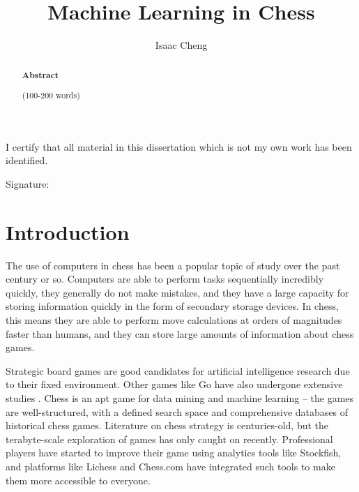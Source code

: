 \documentclass[%
 superscriptaddress,
showpacs,preprintnumbers,
 amsmath,
 amssymb,
 aps,
 pra,
showkeys,
onecolumn,
notitlepage,
11pt,
tightenlines      %
]{revtex4-1}
\begin{document}
\title{\Large Machine Learning in Chess}

\author{Isaac Cheng}

\begin{abstract}
\noindent \textbf{Abstract}

\noindent 
(100-200 words)

\end{abstract}

\maketitle

\vspace*{\fill}


\begin{center}
I certify that all material in this dissertation which is not my own work has been identified.
\end{center}
\vspace{1em}

Signature: \hrulefill


\newpage
\section{Introduction}
The use of computers in chess has been a popular topic of study over the past century or so.  Computers are able to perform tasks sequentially incredibly quickly, they generally do not make mistakes, and they have a large capacity for storing information quickly in the form of secondary storage devices. In chess, this means they are able to perform move calculations at orders of magnitudes faster than humans, and they can store large amounts of information about chess games.

Strategic board games are good candidates for artificial intelligence research due to their fixed environment. Other games like Go have also undergone extensive studies \cite{muller2002computer}. Chess is an apt game for data mining and machine learning -- the games are well-structured, with a defined search space and comprehensive databases of historical chess games. Literature on chess strategy is centuries-old, but the terabyte-scale exploration of games has only caught on recently. Professional players have started to improve their game using analytics tools like Stockfish, and platforms like Lichess and Chess.com have integrated such tools to make them more accessible to everyone.
\end{document}
